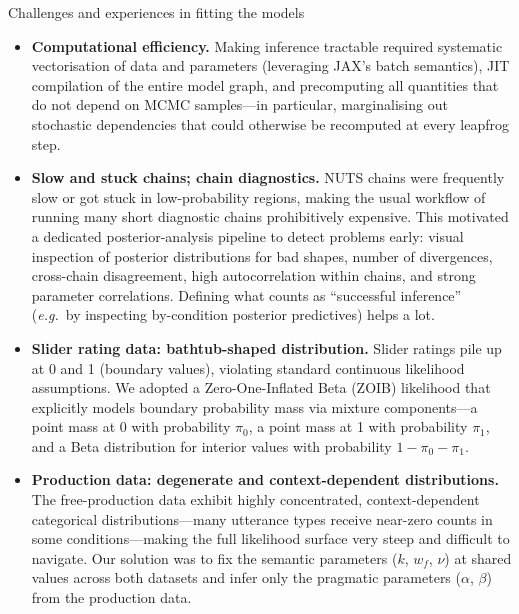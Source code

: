 \documentclass[11pt, a4paper]{article}
\newcommand{\eg}{\textit{e.g.}}
\begin{document}
\begin{discussbox}{Challenges and experiences in fitting the models}
\label{sec:model:challenges}

\begin{itemize}[leftmargin=*]
  \item \textbf{Computational efficiency.}
    Making inference tractable required systematic vectorisation of data and parameters (leveraging JAX's batch semantics), JIT compilation of the entire model graph, and precomputing all quantities that do not depend on MCMC samples---in particular, marginalising out stochastic dependencies that could otherwise be recomputed at every leapfrog step.

  \item \textbf{Slow and stuck chains; chain diagnostics.}
    NUTS chains were frequently slow or got stuck in low-probability regions, making the usual workflow of running many short diagnostic chains prohibitively expensive.
    This motivated a dedicated posterior-analysis pipeline to detect problems early: visual inspection of posterior distributions for bad shapes, number of divergences, cross-chain disagreement, high autocorrelation within chains, and strong parameter correlations.
    Defining what counts as ``successful inference'' (\eg\ by inspecting by-condition posterior predictives) helps a lot.

  \item \textbf{Slider rating data: bathtub-shaped distribution.}
    Slider ratings pile up at 0 and 1 (boundary values), violating standard continuous likelihood assumptions.
    We adopted a Zero-One-Inflated Beta (ZOIB) likelihood that explicitly models boundary probability mass via mixture components---a point mass at 0 with probability $\pi_0$, a point mass at 1 with probability $\pi_1$, and a Beta distribution for interior values with probability $1 - \pi_0 - \pi_1$.

  \item \textbf{Production data: degenerate and context-dependent distributions.}
    The free-production data exhibit highly concentrated, context-dependent categorical distributions---many utterance types receive near-zero counts in some conditions---making the full likelihood surface very steep and difficult to navigate.
    Our solution was to fix the semantic parameters ($k$, $w_f$, $\nu$) at shared values across both datasets and infer only the pragmatic parameters ($\alpha$, $\beta$) from the production data.
\end{itemize}
\end{discussbox}
\newpage
\end{document}
